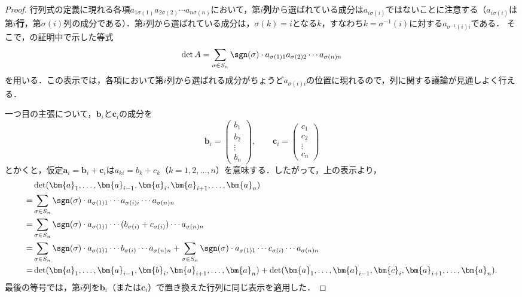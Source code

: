\begin{leftbar}
\begin{proof}
  行列式の定義に現れる各項$a_{1\sigma(1)} a_{2\sigma(2)} \dotsm a_{n\sigma(n)}$において，第$i$\textbf{列}から選ばれている成分は$a_{i\sigma(i)}$ではないことに注意する（$a_{i\sigma(i)}$は第$i$\textbf{行}，第$\sigma(i)$列の成分である）．第$i$列から選ばれている成分は，$\sigma(k) = i$となる$k$，すなわち$k = \sigma^{-1}(i)$に対する$a_{\sigma^{-1}(i)i}$である．
  そこで，の証明中で示した等式
  \[
    \det A = \sum_{\sigma \in S_n} \sgn(\sigma) \cdot a_{\sigma(1)1} a_{\sigma(2)2} \dotsm a_{\sigma(n)n}
  \]
  を用いる．この表示では，各項において第$i$列から選ばれる成分がちょうど$a_{\sigma(i)i}$の位置に現れるので，列に関する議論が見通しよく行える．

  一つ目の主張について，$\bm{b}_i$と$\bm{c}_i$の成分を
  \[
    \bm{b}_i = \begin{pmatrix} b_1 \\ b_2 \\ \vdots \\ b_n \end{pmatrix},
    \qquad
    \bm{c}_i = \begin{pmatrix} c_1 \\ c_2 \\ \vdots \\ c_n \end{pmatrix}
  \]
  とかくと，仮定$\bm{a}_i = \bm{b}_i + \bm{c}_i$は$a_{ki} = b_k + c_k$（$k = 1, 2, \dots, n$）を意味する．したがって，上の表示より，
  \begin{align*} 
    &\det(\bm{a}_1, \dots, \bm{a}_{i-1}, \bm{a}_i, \bm{a}_{i+1}, \dots, \bm{a}_n) \\
    =& \sum_{\sigma \in S_n} \sgn(\sigma) \cdot a_{\sigma(1)1} \dotsm a_{\sigma(i)i} \dotsm a_{\sigma(n)n} \\
    =& \sum_{\sigma \in S_n} \sgn(\sigma) \cdot a_{\sigma(1)1} \dotsm (b_{\sigma(i)} + c_{\sigma(i)}) \dotsm a_{\sigma(n)n} \\
    =& \sum_{\sigma \in S_n} \sgn(\sigma) \cdot a_{\sigma(1)1} \dotsm b_{\sigma(i)} \dotsm a_{\sigma(n)n} 
    + \sum_{\sigma \in S_n} \sgn(\sigma) \cdot a_{\sigma(1)1} \dotsm c_{\sigma(i)} \dotsm a_{\sigma(n)n} \\
    =& \det(\bm{a}_1, \dots, \bm{a}_{i-1}, \bm{b}_i, \bm{a}_{i+1}, \dots, \bm{a}_n) 
     + \det(\bm{a}_1, \dots, \bm{a}_{i-1}, \bm{c}_i, \bm{a}_{i+1}, \dots, \bm{a}_n).
  \end{align*}
  最後の等号では，第$i$列を$\bm{b}_i$（または$\bm{c}_i$）で置き換えた行列に同じ表示を適用した．


\end{proof}
\end{leftbar}
